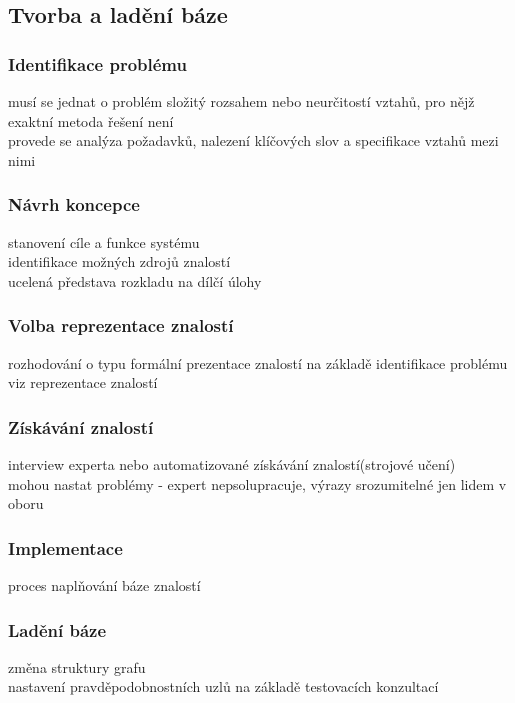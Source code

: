 \subsection{Tvorba a ladění báze}
\subsubsection{Identifikace problému}
musí se jednat o problém složitý rozsahem nebo neurčitostí vztahů, pro nějž exaktní metoda řešení není\\
provede se analýza požadavků, nalezení klíčových slov a specifikace vztahů mezi nimi

\subsubsection{Návrh koncepce}
stanovení cíle a funkce systému\\
identifikace možných zdrojů znalostí\\
ucelená představa rozkladu na dílčí úlohy\\

\subsubsection{Volba reprezentace znalostí}
rozhodování o typu formální prezentace znalostí na základě identifikace problému\\
viz reprezentace znalostí\\

\subsubsection{Získávání znalostí}
interview experta nebo automatizované získávání znalostí(strojové učení)\\
mohou nastat problémy - expert nepsolupracuje, výrazy srozumitelné jen lidem v oboru\\

\subsubsection{Implementace}
proces naplňování báze znalostí\\

\subsubsection{Ladění báze}
změna struktury grafu\\
nastavení pravděpodobnostních uzlů na základě testovacích konzultací\\

